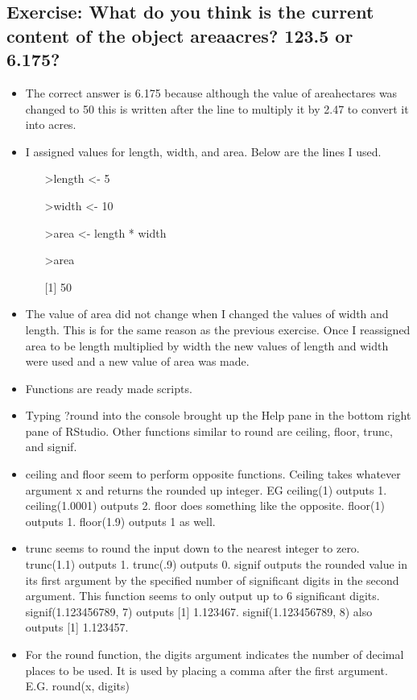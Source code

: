 \documentclass{article}
\begin{document}
\subsection{Exercise: What do you think is the current content of the object area\textunderscore acres? 123.5 or 6.175?}
\begin{itemize}
    \item The correct answer is 6.175 because although the value of area\textunderscore hectares was changed to 50 this is written after the line to multiply it by 2.47 to convert it into acres.
    \item I assigned values for length, width, and area. Below are the lines I used.
    \begin{itemize}
    \item[] \textgreater length \textless- 5
    \item[] \textgreater width \textless- 10
    \item[] \textgreater area \textless- length * width
    \item[] \textgreater area
    \item[] [1] 50
    \end{itemize}
\item The value of area did not change when I changed the values of width and length. This is for the same reason as the previous exercise. Once I reassigned area to be length multiplied by width the new values of length and width were used and a new value of area was made.
\item Functions are ready made scripts. 
\item Typing ?round into the console brought up the Help pane in the bottom right pane of RStudio. Other functions similar to round are ceiling, floor, trunc, and signif.
\item ceiling and floor seem to perform opposite functions. Ceiling takes whatever argument x and returns the rounded up integer. EG ceiling(1) outputs 1. ceiling(1.0001) outputs 2. floor does something like the opposite. floor(1) outputs 1. floor(1.9) outputs 1 as well.
\item trunc seems to round the input down to the nearest integer to zero. trunc(1.1) outputs 1. trunc(.9) outputs 0. signif  outputs the rounded value in its first argument by the specified number of significant digits in the second argument. This function seems to only output up to 6 significant digits. signif(1.123456789, 7) outputs [1] 1.123467. signif(1.123456789, 8) also outputs [1] 1.123457.
\item For the round function, the digits argument indicates the number of decimal places to be used. It is used by placing a comma after the first argument. E.G. round(x, digits)
\end{itemize}
\end{document}
